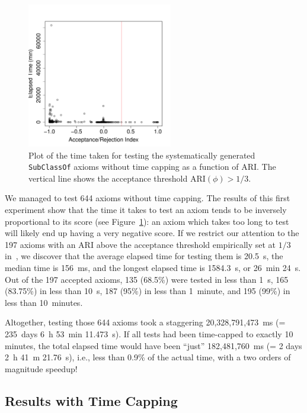 \documentclass{llncs}
\begin{document}
\begin{figure}[t]
\begin{center}
  \includegraphics[height=2.5in]{time-ARI}
\end{center}
\caption{Plot of the time taken for testing the systematically generated
 \texttt{SubClassOf} axioms without time capping as a function of ARI.
  The vertical line shows the acceptance threshold $\mathrm{ARI}(\phi)>1/3$.}
\label{fig:time-ARI}
\end{figure}

We managed to test 644 axioms without time capping.
The results of this first experiment
show that the time it takes to test an axiom tends to be inversely proportional
to its score (see Figure~\ref{fig:time-ARI}): an axiom which takes
too long to test will likely end up having a very negative score.
If we restrict our attention to the 197 axioms with an ARI above the
acceptance threshold empirically set at $1/3$ in~\cite{TettamanziFaronZuckerGandon2014ekaw},
we discover that the average elapsed time for testing them is 20.5~s,
the median time is 156~ms, and the longest elapsed time is 1584.3~s, or 26~min 24~s.
Out of the 197 accepted axioms,
135 (68.5\%) were tested in less than 1~s,
165 (83.75\%) in less than 10~s,
187 (95\%) in less than 1~minute,
and 195 (99\%) in less than 10~minutes.

Altogether, testing those 644 axioms took a staggering 20,328,791,473~ms (= 235~days 6~h 53~min 11.473~s).
If all tests had been time-capped to exactly 10 minutes, the total elapsed time
would have been ``just'' 182,481,760~ms (= 2 days 2~h 41~m 21.76~s),
i.e., less than 0.9\% of the actual time, with a two orders of magnitude speedup!


\subsection{Results with Time Capping}
\label{results-timeout}
\end{document}
